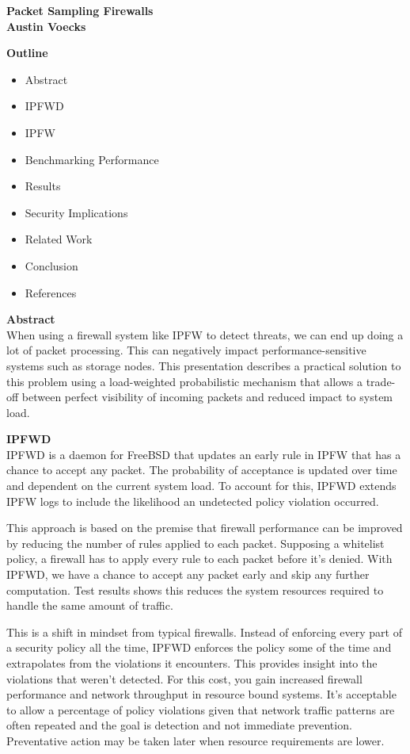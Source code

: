 \documentclass[fleqn]{article}%
\begin{document}
\begin{center}
  \textbf{Packet Sampling Firewalls \\ Austin Voecks}\\
\end{center}

\textbf{Outline}
\begin{itemize}
    \item Abstract
    \item IPFWD
    \item IPFW
    \item Benchmarking Performance
    \item Results
    \item Security Implications
    \item Related Work
    \item Conclusion
    \item References
\end{itemize}

\textbf{Abstract} \\
When using a firewall system like IPFW to detect threats, we can end up doing a
lot of packet processing. This can negatively impact performance-sensitive
systems such as storage nodes. This presentation describes a practical solution
to this problem using a load-weighted probabilistic mechanism that allows a
trade-off between perfect visibility of incoming packets and reduced impact to
system load.

\textbf{IPFWD} \\ 

IPFWD is a daemon for FreeBSD that updates an early rule in
IPFW that has a chance to accept any packet. The probability of acceptance is
updated over time and dependent on the current system load. To account for
this, IPFWD extends IPFW logs to include the likelihood an undetected policy
violation occurred.

This approach is based on the premise that firewall performance can be
improved by reducing the number of rules applied to each packet. Supposing a
whitelist policy, a firewall has to apply every rule to each packet before it's
denied. With IPFWD, we have a chance to accept any packet early and skip any
further computation. Test results shows this reduces the system resources
required to handle the same amount of traffic. 

This is a shift in mindset from typical firewalls. Instead of enforcing every
part of a security policy all the time, IPFWD enforces the policy some of the
time and extrapolates from the violations it encounters. This provides insight
into the violations that weren't detected. For this cost, you gain increased
firewall performance and network throughput in resource bound systems. It's
acceptable to allow a percentage of policy violations given that network
traffic patterns are often repeated and the goal is detection and not immediate
prevention. Preventative action may be taken later when resource requirements
are lower.
\end{document}
